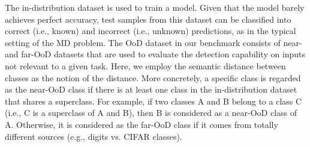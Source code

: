 \documentclass[preprint,12pt]{elsarticle}
\begin{document}
The in-distribution dataset is used to train a model. Given that the model barely achieves perfect accuracy, test samples from this dataset can be classified into correct (i.e., known) and incorrect (i.e., unknown) predictions, as in the typical setting of the MD problem. The OoD dataset in our benchmark consists of near- and far-OoD datasets that are used to evaluate the detection capability on inputs not relevant to a given task. Here, we employ the semantic distance between classes as the notion of the distance. More concretely, a specific class is regarded as the near-OoD class if there is at least one class in the in-distribution dataset that shares a superclass. For example, if two classes A and B belong to a class C (i.e., C is a superclass of A and B), then B is considered as a near-OoD class of A. Otherwise, it is considered as the far-OoD class if it comes from totally different sources (e.g., digits vs. CIFAR classes).
\end{document}
